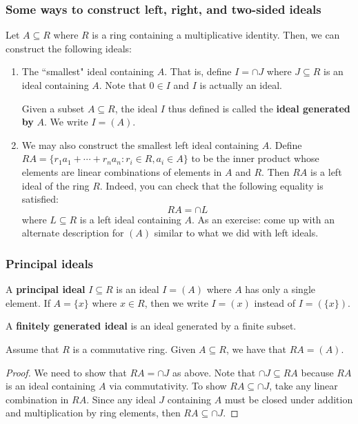 \documentclass{article}
\theoremstyle{plain}
\begin{document}
\subsubsection{Some ways to construct left, right, and two-sided ideals}
Let $A \subseteq R$ where $R$ is a ring containing a multiplicative identity. Then, we can construct the following ideals:
\begin{enumerate}[(1)]
\item The ``smallest" ideal containing $A$. That is, define $I = \cap J$ where $J \subseteq R$ is an ideal containing $A$. Note that $0 \in I$ and $I$ is actually an ideal.
\begin{definition}{}{}
Given a subset $A \subseteq R$, the ideal $I$ thus defined is called the \textbf{ideal generated by} $A$. We write $I = (A)$. %
\end{definition}

\item We may also construct the smallest left ideal containing $A$. Define $RA = \{ r_1a_1 + \cdots + r_na_n : r_i \in R, a_i \in A \}$ to be the inner product whose elements are linear combinations of elements in $A$ and $R$. Then $RA$ is a left ideal of the ring $R$. Indeed, you can check that the following equality is satisfied:
$$RA = \cap L$$
where $L \subseteq R$ is a left ideal containing $A$. As an exercise: come up with an alternate description for $(A)$ similar to what we did with left ideals.

\end{enumerate}

\subsubsection{Principal ideals}

\begin{definition}{}{}
A \textbf{principal ideal} $I \subseteq R$ is an ideal $I = (A)$ where $A$ has only a single element. If $A = \{x\}$ where $x \in R$, then we write $I = (x)$ instead of $I = (\{x\})$.
\end{definition}

\begin{definition}{}{}
A \textbf{finitely generated ideal} is an ideal generated by a finite subset.
\end{definition}

\begin{theorem}{}{}
Assume that $R$ is a commutative ring. Given $A \subseteq R$, we have that $RA = (A)$.
\end{theorem}
\begin{proof}
We need to show that $RA = \cap J$ as above. Note that $\cap J \subseteq RA$ because $RA$ is an ideal containing $A$ via commutativity. To show $RA \subseteq \cap J$, take any linear combination in $RA$. Since any ideal $J$ containing $A$ must be closed under addition and multiplication by ring elements, then $RA \subseteq \cap J$.
\end{proof}
\end{document}
